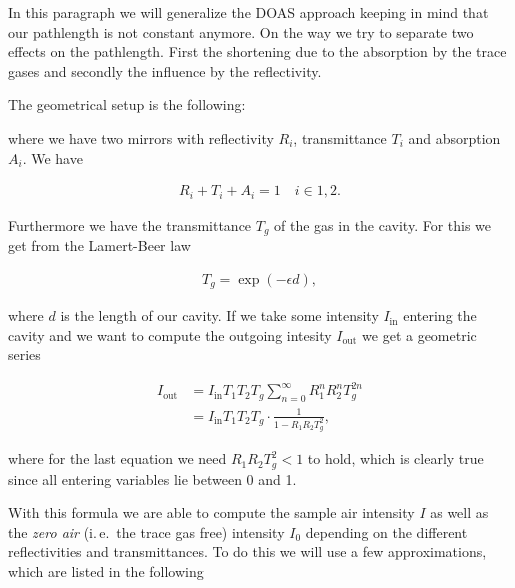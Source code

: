 In this paragraph we will generalize the DOAS approach keeping in mind
that our pathlength is not constant anymore. On the way we try to
separate two effects on the pathlength. First the shortening due to
the absorption by the trace gases and secondly the influence by the
reflectivity.

The geometrical setup is the following:

where we have two mirrors with reflectivity $R_i$, transmittance $T_i$
and absorption $A_i$. We have

\begin{align*}
  R_i + T_i + A_i = 1 \quad i \in{1,2}.
\end{align*}

Furthermore we have the transmittance $T_g$ of the gas in the
cavity. For this we get from the Lamert-Beer law

\begin{align*}
  T_g = \exp(-\epsilon d),
\end{align*}

where $d$ is the length of our cavity. If we take some intensity
$I_{\text{in}}$ entering the cavity and we want to compute the outgoing
intesity $I_{\text{out}}$ we get a geometric series

\begin{align*}
  I_{\text{out}} & = I_{\text{in}} T_1 T_2 T_g \sum_{n=0}^\infty R_1^n R_2^n T_g^{2n}\\
  & = I_{\text{in}} T_1 T_2 T_g \cdot \frac{1}{1 - R_1R_2T_g^2},
\end{align*}

where for the last equation we need $R_1R_2T_g^2 < 1$ to hold, which
is clearly true since all entering variables lie between 0 and 1.

With this formula we are able to compute the sample air intensity $I$
as well as the \emph{zero air} (i.\,e.\ the trace gas free) intensity $I_0$
depending on the different reflectivities and transmittances. To do
this we will use a few approximations, which are listed in the
following

